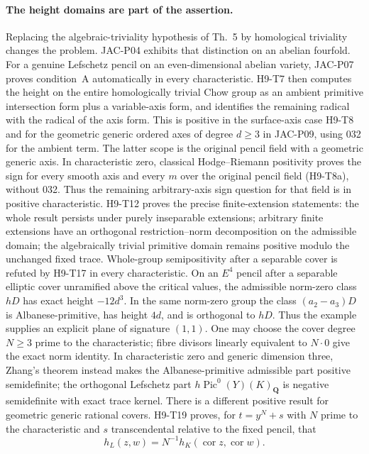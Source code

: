 \paragraph{The height domains are part of the assertion.}
Replacing the algebraic-triviality hypothesis of Th.~5 by
homological triviality changes the problem. JAC-P04 exhibits that
distinction on an abelian fourfold. For a genuine Lefschetz pencil
on an even-dimensional abelian variety, JAC-P07 proves condition~A
automatically in every characteristic. H9-T7 then computes the
height on the entire homologically trivial Chow group as an
ambient primitive intersection form plus a variable-axis form,
and identifies the remaining radical with the radical of the axis
form. This is positive in the surface-axis case
H9-T8 and for the geometric generic ordered axes of degree
$d\ge3$ in JAC-P09, using 032 for the ambient term. The latter
scope is the original pencil field with a geometric generic axis.
In characteristic zero, classical Hodge--Riemann positivity proves
the sign for every smooth axis and every $m$ over the original
pencil field (H9-T8a), without 032. Thus the remaining arbitrary-axis
sign question for that field is in positive characteristic.
H9-T12 proves the precise finite-extension statements: the whole
result persists under purely inseparable extensions; arbitrary
finite extensions have an orthogonal restriction--norm
decomposition on the admissible domain; the algebraically trivial
primitive domain remains positive modulo the unchanged fixed trace.
Whole-group semipositivity after a separable cover is refuted by
H9-T17 in every characteristic. On an $E^4$ pencil after a
separable elliptic cover unramified above the critical values,
the admissible norm-zero class $hD$ has exact height $-12d^3$.
In the same norm-zero group the class $(a_2-a_3)D$ is
Albanese-primitive, has height $4d$, and is orthogonal to $hD$.
Thus the example supplies an explicit plane of signature $(1,1)$.
One may choose the cover degree $N\ge3$ prime to the
characteristic; fibre divisors linearly equivalent to $N\cdot0$
give the exact norm identity. In characteristic zero and generic
dimension three, Zhang's theorem instead makes the
Albanese-primitive admissible part positive semidefinite; the
orthogonal Lefschetz part $h\operatorname{Pic}^0(Y)(K)_{\mathbf Q}$
is negative semidefinite with exact trace kernel.
There is a different positive result for geometric generic rational
covers. H9-T19 proves, for $t=y^N+s$ with $N$ prime to the
characteristic and $s$ transcendental relative to the fixed pencil,
that
\[
 h_L(z,w)=N^{-1}h_K(\operatorname{cor}z,\operatorname{cor}w).
\]

